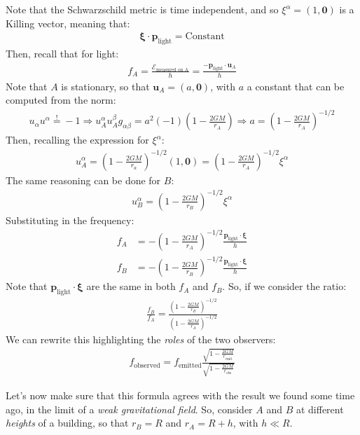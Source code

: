 \documentclass[../template.tex]{subfiles}
\begin{document}
Note that the Schwarzschild metric is time independent, and so $\xi^\alpha = (1, \bm{0})$ is a Killing vector, meaning that:
\begin{align*}
    \bm{\xi} \cdot \bm{p}_{\mathrm{light} } = \text{Constant}
\end{align*} 
Then, recall that for light:
\begin{align*}
    f_A = \frac{\mathcal{E}_{\text{measured on A}}}{h} = \frac{-\bm{p}_{\mathrm{light} }\cdot \bm{u}_A}{h}  
\end{align*}
Note that $A$ is stationary, so that $\bm{u}_A = (a, \bm{0})$, with $a$ a constant that can be computed from the norm:
\begin{align*}
    u_\alpha u^\alpha \overset{!}{=} -1 \Rightarrow u_A^\alpha u_A^\beta g_{\alpha \beta} = a^2 (-1) \left(1-\frac{2 GM}{r_A} \right) \Rightarrow a = \left(1-\frac{2GM}{r_A} \right)^{-1/2}
\end{align*}   
Then, recalling the expression for $\xi^\alpha$: 
\begin{align*}
    u_A^\alpha = \left(1-\frac{2GM}{r_a} \right)^{-1/2} (1, \bm{0}) = \left(1-\frac{2GM}{r_A} \right)^{-1/2} \xi^\alpha
\end{align*}
The same reasoning can be done for $B$:
\begin{align*}
    u_B^\alpha = \left(1-\frac{2GM}{r_B} \right)^{-1/2} \xi^\alpha
\end{align*} 
Substituting in the frequency:
\begin{align*}
    f_A &= -\left(1-\frac{2GM}{r_A} \right)^{-1/2} \frac{\bm{p}_{\mathrm{light} }\cdot \bm{\xi}}{h} \\
    f_B &= -\left(1-\frac{2GM}{r_B} \right)^{-1/2} \frac{\bm{p}_{\mathrm{light} }\cdot \bm{\xi}}{h} 
\end{align*}
Note that $\bm{p}_{\mathrm{light} }\cdot \bm{\xi}$ are the same in both $f_A$ and $f_B$. So, if we consider the ratio:
\begin{align*}
    \frac{f_B}{f_A} = \frac{\left(1-\frac{2GM}{r_B} \right)^{-1/2}}{\left(1-\frac{2GM}{r_A} \right)^{-1/2}}  
\end{align*}   
We can rewrite this highlighting the \textit{roles} of the two observers:
\begin{align*}
    f_{\mathrm{observed} } = f_{\mathrm{emitted} } \frac{\displaystyle\sqrt{1-\frac{2GM}{r_{\mathrm{emit} }} }}{\displaystyle \sqrt{1-\frac{2GM}{r_{\mathrm{obs} }} }} 
\end{align*} 

Let's now make sure that this formula agrees with the result we found some time ago, in the limit of a \textit{weak gravitational field}. So, consider $A$ and $B$ at different \textit{heights} of a building, so that $r_B = R$ and $r_A = R + h$, with $h \ll R$.
\end{document}
